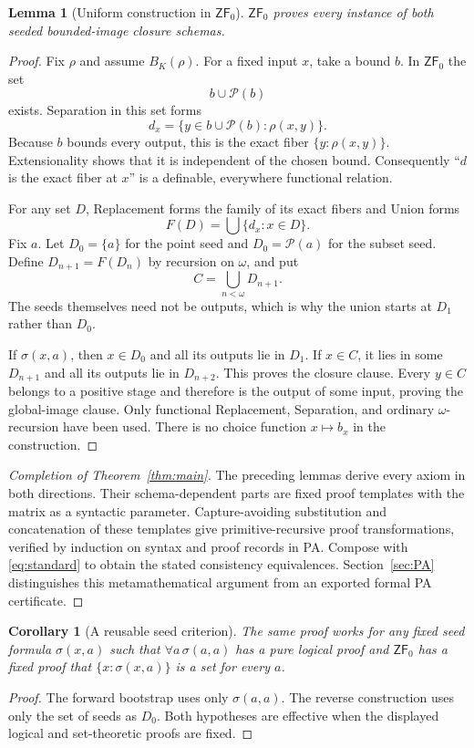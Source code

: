 \documentclass[11pt,letterpaper]{article}
\newtheorem{lemma}[theorem]{Lemma}
\newtheorem{corollary}[theorem]{Corollary}
\theoremstyle{definition}\newtheorem{definition}[theorem]{Definition}
\theoremstyle{remark}\newtheorem{remark}[theorem]{Remark}
\newcommand{\ZFz}{\mathsf{ZF}_{0}}
\newcommand{\Pow}{\mathcal{P}}
\begin{document}
\begin{lemma}[Uniform construction in $\ZFz$]\label{lem:reverse}
$\ZFz$ proves every instance of both seeded bounded-image closure schemas.
\end{lemma}
\begin{proof}
Fix $\rho$ and assume $B_K(\rho)$. For a fixed input $x$, take a bound
$b$. In $\ZFz$ the set
\[
 b\cup\Pow(b)
\]
exists. Separation in this set forms
\[
 d_x=\{y\in b\cup\Pow(b):\rho(x,y)\}.
\]
Because $b$ bounds every output, this is the exact fiber
$\{y:\rho(x,y)\}$. Extensionality shows that it is independent of the
chosen bound. Consequently ``$d$ is the exact fiber at $x$'' is a
definable, everywhere functional relation.

For any set $D$, Replacement forms the family of its exact fibers and
Union forms
\[
 F(D)=\bigcup\{d_x:x\in D\}.
\]
Fix $a$. Let $D_0=\{a\}$ for the point seed and $D_0=\Pow(a)$ for the
subset seed. Define $D_{n+1}=F(D_n)$ by recursion on $\omega$, and put
\begin{equation}\label{eq:positiveorbit}
 C=\bigcup_{n<\omega}D_{n+1}.
\end{equation}
The seeds themselves need not be outputs, which is why the union starts
at $D_1$ rather than $D_0$.

If $\sigma(x,a)$, then $x\in D_0$ and all its outputs lie in $D_1$.
If $x\in C$, it lies in some $D_{n+1}$ and all its outputs lie in
$D_{n+2}$. This proves the closure clause. Every $y\in C$ belongs to a
positive stage and therefore is the output of some input, proving the
global-image clause. Only functional Replacement, Separation, and
ordinary $\omega$-recursion have been used. There is no choice function
$x\mapsto b_x$ in the construction.
\end{proof}

\begin{proof}[Completion of Theorem~\ref{thm:main}]
The preceding lemmas derive every axiom in both directions. Their
schema-dependent parts are fixed proof templates with the matrix as a
syntactic parameter. Capture-avoiding substitution and concatenation of
these templates give primitive-recursive proof transformations, verified
by induction on syntax and proof records in PA. Compose with
\eqref{eq:standard} to obtain the stated consistency equivalences.
Section~\ref{sec:PA} distinguishes this metamathematical argument from an
exported formal PA certificate.
\end{proof}

\begin{corollary}[A reusable seed criterion]\label{cor:seed}
The same proof works for any fixed seed formula $\sigma(x,a)$ such that
$\forall a\,\sigma(a,a)$ has a pure logical proof and $\ZFz$ has a fixed
proof that $\{x:\sigma(x,a)\}$ is a set for every $a$.
\end{corollary}
\begin{proof}
The forward bootstrap uses only $\sigma(a,a)$. The reverse construction
uses only the set of seeds as $D_0$. Both hypotheses are effective when
the displayed logical and set-theoretic proofs are fixed.
\end{proof}
\end{document}
